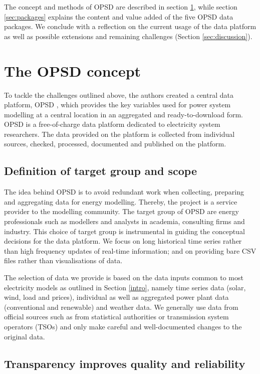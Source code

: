 \documentclass[article,sort&compress]{elsarticle}
\begin{document}
The concept and methods of OPSD are described in section \ref{sec:OPSD}, while section \ref{sec:packages} explains the content and value added of the five OPSD data packages. We conclude with a reflection on the current usage of the data platform as well as possible extensions and remaining challenges (Section \ref{sec:discussion}).



\section{The OPSD concept}
\label{sec:OPSD}

To tackle the challenges outlined above, the authors created a central data platform, OPSD \cite{OPSD}, which provides the key variables used for power system modelling at a central location in an aggregated and ready-to-download form. OPSD is a free-of-charge data platform dedicated to electricity system researchers. The data provided on the platform is collected from individual sources, checked, processed, documented and published on the platform.


\subsection{Definition of target group and scope}

The idea behind OPSD is to avoid redundant work when collecting, preparing and aggregating data for energy modelling. Thereby, the project is a service provider to the modelling community. The target group of OPSD are energy professionals such as modellers and analysts in academia, consulting firms and industry. This choice of target group is instrumental in guiding the conceptual decisions for the data platform. We focus on long historical time series rather than high frequency updates of real-time information; and on providing bare CSV files rather than visualisations of data.

The selection of data we provide is based on the data inputs common to most electricity models as outlined in Section \ref{intro}, namely time series data (solar, wind, load and prices), individual as well as aggregated power plant data (conventional and renewable) and weather data. We generally use data from official sources such as from statistical authorities or transmission system operators (TSOs) and only make careful and well-documented changes to the original data.

\subsection{Transparency improves quality and reliability}
\end{document}

